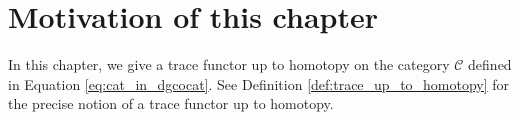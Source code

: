 \section{Motivation of this chapter}
In this chapter, we give a trace functor 
up to homotopy on the category $\mathcal{C}$ 
defined in Equation \ref{eq:cat_in_dgcocat}. 
See Definition \ref{def:trace_up_to_homotopy} 
for the precise notion of a trace functor 
up to homotopy.